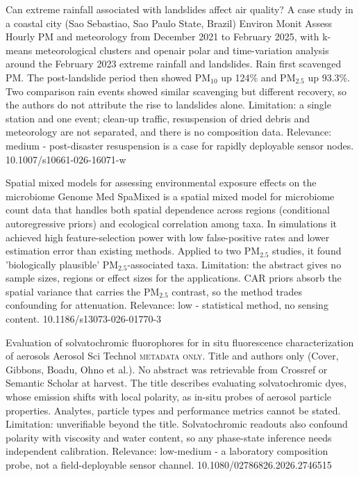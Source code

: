 \documentclass[10pt]{article}
\begin{document}
{Can extreme rainfall associated with landslides affect air quality? A case study in a coastal city (Sao Sebastiao, Sao Paulo State, Brazil)}
{Environ Monit Assess}
{Hourly PM and meteorology from December 2021 to February 2025, with k-means meteorological clusters and openair polar and time-variation analysis around the February 2023 extreme rainfall and landslides. Rain first scavenged PM. The post-landslide period then showed PM$_{10}$ up 124\% and PM$_{2.5}$ up 93.3\%. Two comparison rain events showed similar scavenging but different recovery, so the authors do not attribute the rise to landslides alone. Limitation: a single station and one event; clean-up traffic, resuspension of dried debris and meteorology are not separated, and there is no composition data. Relevance: medium - post-disaster resuspension is a case for rapidly deployable sensor nodes.}
{10.1007/s10661-026-16071-w}

{Spatial mixed models for assessing environmental exposure effects on the microbiome}
{Genome Med}
{SpaMixed is a spatial mixed model for microbiome count data that handles both spatial dependence across regions (conditional autoregressive priors) and ecological correlation among taxa. In simulations it achieved high feature-selection power with low false-positive rates and lower estimation error than existing methods. Applied to two PM$_{2.5}$ studies, it found 'biologically plausible' PM$_{2.5}$-associated taxa. Limitation: the abstract gives no sample sizes, regions or effect sizes for the applications. CAR priors absorb the spatial variance that carries the PM$_{2.5}$ contrast, so the method trades confounding for attenuation. Relevance: low - statistical method, no sensing content.}
{10.1186/s13073-026-01770-3}

\par{}\baselineskip{}\baselineskip
{}

{Evaluation of solvatochromic fluorophores for in situ fluorescence characterization of aerosols}
{Aerosol Sci Technol}
{\textsc{metadata only.} Title and authors only (Cover, Gibbons, Boadu, Ohno et al.). No abstract was retrievable from Crossref or Semantic Scholar at harvest. The title describes evaluating solvatochromic dyes, whose emission shifts with local polarity, as in-situ probes of aerosol particle properties. Analytes, particle types and performance metrics cannot be stated. Limitation: unverifiable beyond the title. Solvatochromic readouts also confound polarity with viscosity and water content, so any phase-state inference needs independent calibration. Relevance: low-medium - a laboratory composition probe, not a field-deployable sensor channel.}
{10.1080/02786826.2026.2746515}
\end{document}
